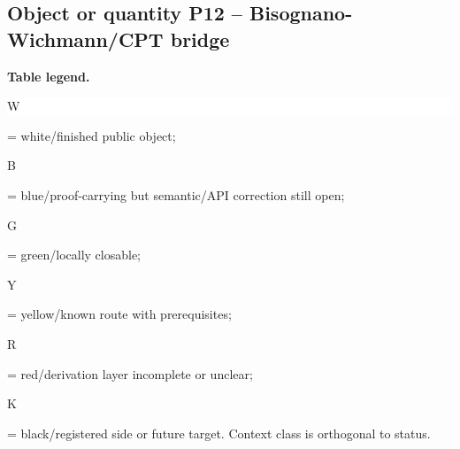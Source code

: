 \subsection*{Object or quantity P12 -- Bisognano-Wichmann/\allowbreak{}CPT bridge}
\hypertarget{objproof:P12}{}
\par\smallskip\noindent\begin{minipage}{0.99\linewidth}\footnotesize\raggedright\textbf{Table legend.} \colorbox{white}{\strut W} = white/finished public object; \colorbox{cyan!20}{\strut B} = blue/proof-carrying but semantic/API correction still open; \colorbox{green!18}{\strut G} = green/locally closable; \colorbox{yellow!25}{\strut Y} = yellow/known route with prerequisites; \colorbox{red!20}{\strut R} = red/derivation layer incomplete or unclear; \colorbox{black!18}{\strut K} = black/registered side or future target. Context class is orthogonal to status.\end{minipage}\par\vspace{0.25em}
